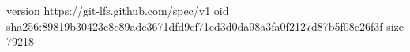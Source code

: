 version https://git-lfs.github.com/spec/v1
oid sha256:89819b30423c8c89adc3671dfd9cf71cd3d0da98a3fa0f2127d87b5f08c26f3f
size 79218
